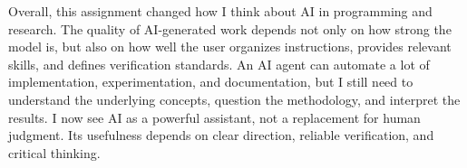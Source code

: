Overall, this assignment changed how I think about AI in programming and research. The quality of AI-generated work depends not only on how strong the model is, but also on how well the user organizes instructions, provides relevant skills, and defines verification standards. An AI agent can automate a lot of implementation, experimentation, and documentation, but I still need to understand the underlying concepts, question the methodology, and interpret the results. I now see AI as a powerful assistant, not a replacement for human judgment. Its usefulness depends on clear direction, reliable verification, and critical thinking.

